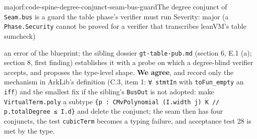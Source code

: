 \begin{finding}{major}{f:code-spine-degree-conjunct-seam-bus-guard}{The degree conjunct of \texttt{Seam.\allowbreak{}bus} is a guard the table phase's verifier must run}
Severity: major (a \texttt{Phase.\allowbreak{}Security} cannot be proved for a verifier that transcribes leanVM's table sumcheck)

an error of the blueprint; the sibling dossier \texttt{gt-{}table-{}pub.\allowbreak{}md} (section 6, E.1 (a); section 8, first finding) establishes it with a probe on which a degree-blind verifier accepts, and proposes the type-level shape. \textbf{We agree}, and record only the mechanism in ArkLib's definition (C.3, item 1: \texttt{∀ stmtIn} with \texttt{toFun\_\allowbreak{}empty} an \texttt{iff}) and the smallest fix if the sibling's \texttt{BusOut} is not adopted: make \texttt{VirtualTerm.\allowbreak{}poly} a subtype \texttt{\{\allowbreak{}p\allowbreak{} :\allowbreak{} C\allowbreak{}M\allowbreak{}v\allowbreak{}P\allowbreak{}o\allowbreak{}l\allowbreak{}y\allowbreak{}n\allowbreak{}o\allowbreak{}m\allowbreak{}i\allowbreak{}a\allowbreak{}l\allowbreak{} (\allowbreak{}I\allowbreak{}.\allowbreak{}w\allowbreak{}i\allowbreak{}d\allowbreak{}t\allowbreak{}h\allowbreak{} j\allowbreak{})\allowbreak{} K\allowbreak{} /\allowbreak{}/\allowbreak{} p\allowbreak{}.\allowbreak{}t\allowbreak{}o\allowbreak{}t\allowbreak{}a\allowbreak{}l\allowbreak{}D\allowbreak{}e\allowbreak{}g\allowbreak{}r\allowbreak{}e\allowbreak{}e\allowbreak{} ≤\allowbreak{} I\allowbreak{}.\allowbreak{}d\allowbreak{}\}} and delete the conjunct; the seam then has four conjuncts, the test \texttt{cubicTerm} becomes a typing failure, and acceptance test 28 is met by the type.

\end{finding}

